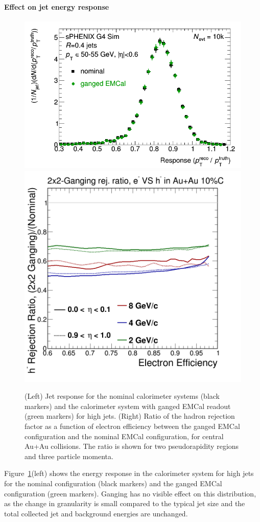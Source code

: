 \paragraph{Effect on jet energy response}
\begin{figure}[hbt]
  \centering
  \includegraphics[width=0.4\linewidth]{figs/jetresponse_ganged_ecal}
  \hspace{0.1\linewidth}
  \includegraphics[width=0.4\linewidth]{figs/hadron_rejection_ganged_over_nominal}
  \caption{(Left)
  Jet response for the nominal calorimeter systems (black markers) and the calorimeter system with ganged EMCal readout 
(green markers) for high \pt jets.
   (Right)
  Ratio of the hadron rejection factor as a function of electron efficiency between the ganged EMCal configuration 
and the nominal EMCal configuration, for central Au+Au collisions. The ratio is shown for two pseudorapidity regions 
and three particle momenta. }
  \label{fig:jet_containment_nominal}
\end{figure}
Figure~\ref{fig:jet_containment_nominal}(left) shows the energy response in the calorimeter system for high \pt jets for the 
nominal configuration (black markers) and the ganged EMCal configuration (green markers). Ganging has no visible effect
on this distribution, as the change in granularity is small compared to the typical jet size and the total collected
jet and background energies are unchanged.

